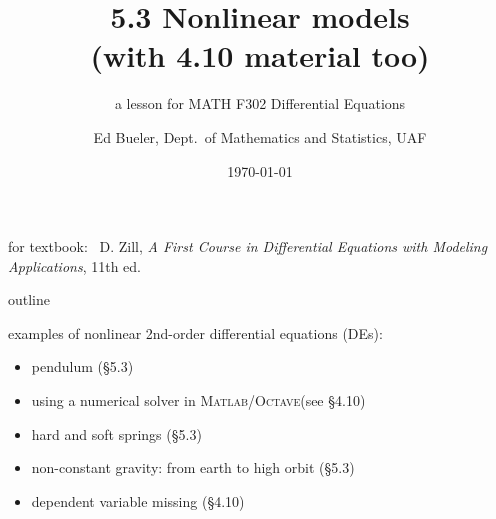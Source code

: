 \documentclass[urlcolor=blue,dvipsnames]{beamer}
\title{5.3 Nonlinear models \\ (with 4.10 material too)}
\subtitle{a lesson for MATH F302 Differential Equations}
\author{Ed Bueler, Dept.~of Mathematics and Statistics, UAF}
\date{\tiny \today}
\newcommand{\Matlab}{\textsc{Matlab}\xspace}
\newcommand{\Octave}{\textsc{Octave}\xspace}
\begin{document}


\begin{frame}
\titlepage

\centerline{\tiny for textbook: \, D. Zill, \emph{A First Course in Differential Equations with Modeling Applications}, 11th ed.}
\end{frame}


\begin{frame}{outline}

examples of nonlinear 2nd-order differential equations (DEs):

\begin{itemize}
\item pendulum (\S 5.3)
\item using a numerical solver in \Matlab/\Octave (see \S4.10)
\item hard and soft springs (\S 5.3)
\item non-constant gravity: from earth to high orbit (\S 5.3)
\item dependent variable missing (\S 4.10)
\end{itemize}
\end{frame}
\end{document}

